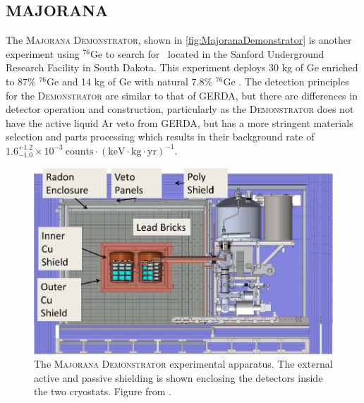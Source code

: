 \subsection{MAJORANA}
The \textsc{Majorana Demonstrator}, shown in \autoref{fig:MajoranaDemonstrator} is another experiment using $^{76}$Ge to search for \zeronubb~located in the Sanford Underground Research Facility in South Dakota.
This experiment deploys 30 kg of Ge enriched to 87\% $^{76}$Ge and 14 kg of Ge with natural 7.8\% $^{76}$Ge \cite{1742-6596-606-1-012004}.
The detection principles for the \textsc{Demonstrator} are similar to that of GERDA, but there are differences in detector operation and construction, particularly as the \textsc{Demonstrator} does not have the active liquid Ar veto from GERDA, but has a more stringent materials selection and parts processing which results in their background rate of $1.6^{+1.2}_{-1.0}\times10^{-3} ~\textrm{counts}\cdot(\textrm{keV}\cdot \textrm{kg} \cdot \textrm{yr})^{-1}$.
\begin{figure}
    \centering
    \includegraphics[width=0.8\linewidth]{Figures/MajoranaDemonstrator.png}
    \caption[The \textsc{Majorana Demonstrator} experimental apparatus.]
    {The \textsc{Majorana Demonstrator} experimental apparatus.
    The external active and passive shielding is shown enclosing the detectors inside the two cryostats.
    Figure from \cite{1742-6596-606-1-012004}.}
    \label{fig:MajoranaDemonstrator}
\end{figure}
